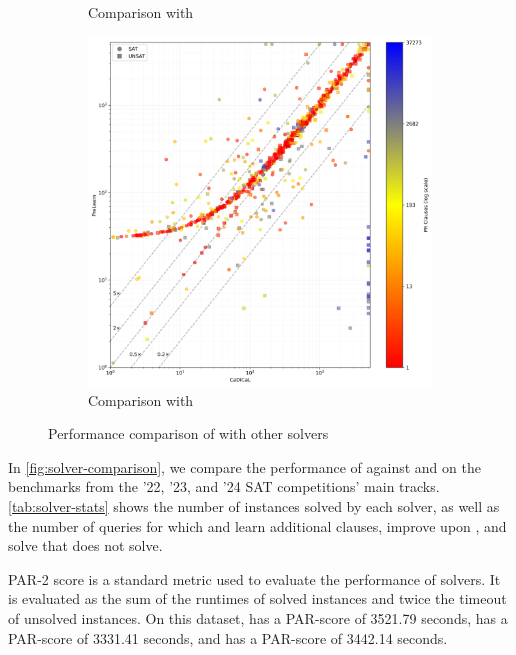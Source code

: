 \begin{figure}[!t]
\begin{subfigure}[t]{0.3\textwidth}
        \caption{Comparison with \prelearn}
        \label{fig:cautical-vs-prelearn}
    \end{subfigure}
    \begin{subfigure}[t]{0.3\textwidth}
        \centering
        \includegraphics[width=\textwidth]{figs/cadical_vs_prelearn.jpg}
        \caption{Comparison with \prelearn}
        \label{fig:cautical-vs-prelearn}
    \end{subfigure}
    \caption{Performance comparison of \tool with other solvers}
    \label{fig:solver-comparison}
\end{figure}

In \autoref{fig:solver-comparison}, we compare the performance of \tool against \cadical and \prelearn on the benchmarks from the '22, '23, and '24 SAT competitions' main tracks. \autoref{tab:solver-stats} shows the number of instances solved by each solver, as well as the number of queries for which \prelearn and \cadical learn additional clauses, improve upon \cadical, and solve that \cadical does not solve.

PAR-2 score is a standard metric used to evaluate the performance of solvers.
It is evaluated as the sum of the runtimes of solved instances and twice the timeout of unsolved instances. On this dataset, \cadical has a PAR-score of 3521.79 seconds, \prelearn has a PAR-score of 3331.41 seconds, and \tool has a PAR-score of 3442.14 seconds.

